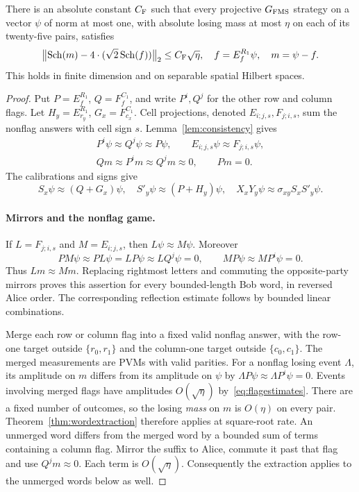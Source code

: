 \begin{theorem}\label{thm:robustsector}
There is an absolute constant $C_{\rm F}$ such that every projective
$G_{\mathrm{FMS}}$ strategy on a vector $\psi$ of norm at most one, with absolute
losing mass at most $\eta$ on each of its twenty-five pairs, satisfies
\begin{equation}\label{eq:robustsector}
\bigl\|\operatorname{Sch}(m)-4\mathbin{\cdot}(\sqrt2\operatorname{Sch}(f))\bigr\|_2
\leq C_{\rm F}\sqrt\eta,
\quad f=E_f^{R_1}\psi,\quad m=\psi-f.
\end{equation}
This holds in finite dimension and on separable spatial Hilbert spaces.
\end{theorem}
\begin{proof}
Put $P=E_f^{R_1}$, $Q=F_f^{C_1}$, and write $P^i,Q^j$ for the other
row and column flags. Let $H_y=E_{r_y}^{R_1}$, $G_x=F_{c_x}^{C_1}$.
Cell projections, denoted $E_{i;j,s},F_{j;i,s}$, sum the nonflag answers
with cell sign $s$. Lemma~\ref{lem:consistency} gives
\begin{gather}\label{eq:flagestimates}
P^i\psi\approx Q^j\psi\approx P\psi,\qquad
E_{i;j,s}\psi\approx F_{j;i,s}\psi,\nonumber\\
Qm\approx P^im\approx Q^jm\approx0,\qquad Pm=0.
\end{gather}
The calibrations and signs give
\begin{equation}\label{eq:calibrationestimates}
S_x\psi\approx(Q+G_x)\psi,\quad
S'_y\psi\approx(P+H_y)\psi,\quad
X_xY_y\psi\approx\sigma_{xy}S_xS'_y\psi.
\end{equation}

\paragraph{Mirrors and the nonflag game.}
If $L=F_{j;i,s}$ and $M=E_{i;j,s}$, then $L\psi\approx M\psi$.
Moreover
\[
PM\psi\approx PL\psi=LP\psi\approx LQ^j\psi=0,
\qquad MP\psi\approx MP^i\psi=0.
\]
Thus $Lm\approx Mm$. Replacing rightmost letters and commuting the
opposite-party mirrors proves this assertion for every bounded-length
Bob word, in reversed Alice order. The corresponding reflection estimate
follows by bounded linear combinations.

Merge each row or column flag into a fixed valid nonflag answer, with
the row-one target outside $\{r_0,r_1\}$ and the column-one target outside
$\{c_0,c_1\}$. The merged measurements are PVMs with valid parities.
For a nonflag losing event $\Lambda$, its amplitude on $m$ differs from
its amplitude on $\psi$ by $\Lambda P\psi\approx\Lambda P^i\psi=0$.
Events involving merged flags have amplitudes $O(\sqrt\eta)$
by~\eqref{eq:flagestimates}. There are a fixed number of outcomes, so
the losing \emph{mass} on $m$ is $O(\eta)$ on every pair.
Theorem~\ref{thm:wordextraction} therefore applies at square-root rate.
An unmerged word differs from the merged word by a bounded sum of terms
containing a column flag. Mirror the suffix to Alice, commute it past
that flag and use $Q^jm\approx0$. Each term is $O(\sqrt\eta)$.
Consequently the extraction applies to the unmerged words below as well.


\end{proof}
